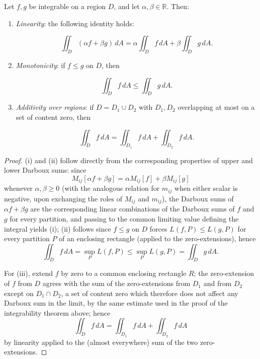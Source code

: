 \begin{theorem}
Let $f,g$ be integrable on a region $D$, and let $\alpha,\beta \in \mathbb{R}$. Then:
\begin{enumerate}
\item[(i)] \textit{Linearity}: the following identity holds:

\[
\iint_D (\alpha f + \beta g)\, dA = \alpha \iint_D f\, dA + \beta \iint_D g\, dA.
\]

\item[(ii)] \textit{Monotonicity}: if $f \leq g$ on $D$, then

\[
\iint_D f\, dA \leq \iint_D g\, dA.
\]

\item[(iii)] \textit{Additivity over regions}: if $D = D_1 \cup D_2$ with $D_1, D_2$ overlapping at most on a set of content zero, then

\[
\iint_D f\, dA = \iint_{D_1} f\, dA + \iint_{D_2} f\, dA.
\]

\end{enumerate}
\end{theorem}

\begin{proof}
(i) and (ii) follow directly from the corresponding properties of upper and lower Darboux sums: since
\[
M_{ij}[\alpha f + \beta g] = \alpha M_{ij}[f] + \beta M_{ij}[g]
\]
 whenever $\alpha,\beta \geq 0$ (with the analogous relation for $m_{ij}$ when either scalar is negative, upon exchanging the roles of $M_{ij}$ and $m_{ij}$), the Darboux sums of $\alpha f + \beta g$ are the corresponding linear combinations of the Darboux sums of $f$ and $g$ for every partition, and passing to the common limiting value defining the integral yields (i); (ii) follows since $f \leq g$ on $D$ forces $L(f,P) \leq L(g,P)$ for every partition $P$ of an enclosing rectangle (applied to the zero-extensions), hence
\[
\iint_D f\,dA = \sup_P L(f,P) \leq \sup_P L(g,P) = \iint_D g\, dA.
\]

For (iii), extend $f$ by zero to a common enclosing rectangle $R$; the zero-extension of $f$ from $D$ agrees with the sum of the zero-extensions from $D_1$ and from $D_2$ except on $D_1 \cap D_2$, a set of content zero which therefore does not affect any Darboux sum in the limit, by the same estimate used in the proof of the integrability theorem above; hence
\[
\iint_D f \, dA = \iint_{D_1} f\, dA + \iint_{D_2} f \, dA
\]
by linearity applied to the (almost everywhere) sum of the two zero-extensions.
\end{proof}

